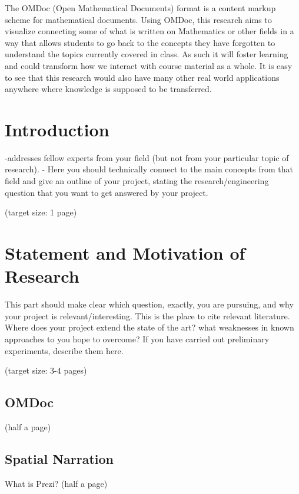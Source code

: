 \documentclass[twoside]{article}
\begin{document}
The OMDoc (Open Mathematical Documents) format is a content markup scheme for mathematical documents. Using OMDoc, this research aims to visualize connecting some of what is written on Mathematics or other fields in a way that allows students to go back to the concepts they have forgotten to understand the topics currently covered in class. As such it will foster learning and could transform how we interact with course material as a whole. It is easy to see that this research would also have many other real world applications anywhere where knowledge is supposed to be transferred.\\ 

  \newpage
  \tableofcontents

  \clearpage

  \section{Introduction}



-addresses fellow experts from your field (but not from your particular topic of research). 
- Here you should technically connect to the main concepts from that field and give an outline of your project, stating the research/engineering question that you want to get answered by your project.



  (target size: 1 page)
\newpage
  \section{Statement and Motivation of Research}
  This part should make clear which question, exactly, you are
  pursuing, and why your project is relevant/interesting. This is the
  place to cite relevant literature. Where does your project extend
  the state of the art? what weaknesses in known approaches to you
  hope to overcome? If you have carried out preliminary experiments,
  describe them here.

(target size: 3-4 pages)

\subsection{OMDoc}
(half a page)
\vspace*{8cm}
\subsection{Spatial Narration}
What is Prezi?
(half a page)
\vspace*{8cm}
\end{document}
